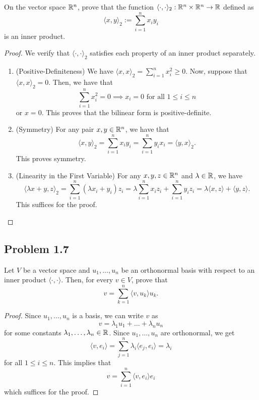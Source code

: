 \documentclass[12pt]{article}
\begin{document}
\begin{problem}
	On the vector space $\mathbb{R}^n$, prove that the function $\langle \cdot, \cdot \rangle_2 : \mathbb{R}^n \times \mathbb{R}^n \to \mathbb{R}$ defined as 
	\[
		\langle x, y \rangle_2 := \sum_{i = 1}^n x_i y_i
	\]
	is an inner product. 
\end{problem}
\begin{proof}
	We verify that $\langle \cdot, \cdot \rangle_2$ satisfies each property of an inner product separately. 
	\begin{enumerate}[label = (\alph*)]
		\item (Positive-Definiteness) We have $\langle x, x \rangle_2 = \sum_{i = 1}^n x_i^2 \geq 0$. Now, suppose that $\langle x, x \rangle_2 = 0$. Then, we have that 
		\[
			\sum_{i = 1}^n x_i^2 = 0 \implies x_i = 0 \text{ for all } 1 \leq i \leq n
		\]
		or $x = 0$. This proves that the bilinear form is positive-definite. 

		\item (Symmetry) For any pair $x, y \in \mathbb{R}^n$, we have that 
		\[
			\langle x, y \rangle_2 = \sum_{i = 1}^n x_iy_i = \sum_{i = 1}^n y_ix_i = \langle y, x \rangle_2. 
		\]
		This proves symmetry. 

		\item (Linearity in the First Variable) For any $x, y, z \in \mathbb{R}^n$ and $\lambda \in \mathbb{R}$, we have 
		\[
			\langle \lambda x + y, z \rangle_2 = \sum_{i = 1}^n (\lambda x_i + y_i) z_i = \lambda \sum_{i = 1}^n x_i z_i + \sum_{i = 1}^n y_i z_i = \lambda \langle x, z \rangle + \langle y, z \rangle. 
		\]
		This suffices for the proof. 
	\end{enumerate}
\end{proof}

\newpage 

\subsection{Problem 1.7}

\begin{problem}
	Let $V$ be a vector space and $u_1, \ldots, u_n$ be an orthonormal basis with respect to an inner product $\langle \cdot, \cdot \rangle$. Then, for every $v \in V$, prove that 
	\[
		v = \sum_{k = 1}^n \langle v, u_k \rangle u_k. 
	\]
\end{problem}
\begin{proof}
	Since $u_1, \ldots, u_n$ is a basis, we can write $v$ as 
	\[
		v = \lambda_1 u_1 + \ldots + \lambda_n u_n
	\]
	for some constants $\lambda_1, \ldots, \lambda_n \in \mathbb{R}$. Since $u_1, \ldots, u_n$ are orthonormal, we get 
	\[
		\langle v, e_i \rangle = \sum_{j = 1}^n \lambda_i \langle e_j, e_i \rangle = \lambda_i
	\]
	for all $1 \leq i \leq n$. This implies that 
	\[
		v = \sum_{i = 1}^n \langle v, e_i \rangle e_i
	\]
	which suffices for the proof. 
\end{proof}
\end{document}

